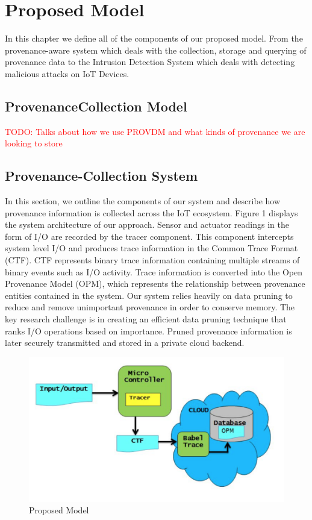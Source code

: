 
\chapter{Proposed Model}

In this chapter we define all of the components of our proposed model. From the provenance-aware system which deals with the collection, storage and querying of provenance data to the  Intrusion Detection System which deals with detecting malicious attacks on IoT Devices.

\section{Provenance\-Collection Model}

\textcolor{red}{TODO: Talks about how we use PROV\-DM and what kinds of provenance we are looking to store}

\section{Provenance-Collection System}

In this section, we outline the components of our system and describe how provenance information is collected across the IoT ecosystem. Figure 1 displays the system architecture of our approach. Sensor and actuator readings in the form of I/O are recorded by the tracer component. This component intercepts system level I/O and produces trace information in the Common Trace Format (CTF). CTF represents binary trace information containing multiple streams of binary events such as I/O activity. Trace information is converted into the Open Provenance Model (OPM), which represents the relationship between provenance entities contained in the system. Our system relies heavily on data pruning to reduce and remove unimportant provenance in order to conserve memory. The key research challenge is in creating an efficient data pruning technique that ranks I/O operations based on importance. Pruned provenance information is later securely transmitted and stored in a private cloud backend.

\begin{figure}[h]
\begin{center}

\includegraphics{architecture.PNG}    
\end{center}
\caption{Proposed Model}
\label{autom}
\end{figure}

